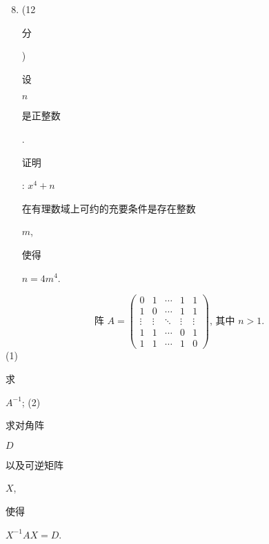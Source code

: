 \documentclass[10pt]{article}
\begin{document}
\begin{enumerate}
  \setcounter{enumi}{7}
  \item (12 \begin{CJK}{UTF8}{mj}分\end{CJK}) \begin{CJK}{UTF8}{mj}设\end{CJK} $n$ \begin{CJK}{UTF8}{mj}是正整数\end{CJK}. \begin{CJK}{UTF8}{mj}证明\end{CJK}: $x^{4}+n$ \begin{CJK}{UTF8}{mj}在有理数域上可约的充要条件是存在整数\end{CJK} $m$, \begin{CJK}{UTF8}{mj}使得\end{CJK} $n=4 m^{4}$.
\end{enumerate}
$$
\text { 阵 } A=\left(\begin{array}{ccccc}
0 & 1 & \cdots & 1 & 1 \\
1 & 0 & \cdots & 1 & 1 \\
\vdots & \vdots & \ddots & \vdots & \vdots \\
1 & 1 & \cdots & 0 & 1 \\
1 & 1 & \cdots & 1 & 0
\end{array}\right) \text {, 其中 } n>1 \text {. }
$$
(1) \begin{CJK}{UTF8}{mj}求\end{CJK} $A^{-1}$; (2) \begin{CJK}{UTF8}{mj}求对角阵\end{CJK} $D$ \begin{CJK}{UTF8}{mj}以及可逆矩阵\end{CJK} $X$, \begin{CJK}{UTF8}{mj}使得\end{CJK} $X^{-1} A X=D$.
\end{document}
